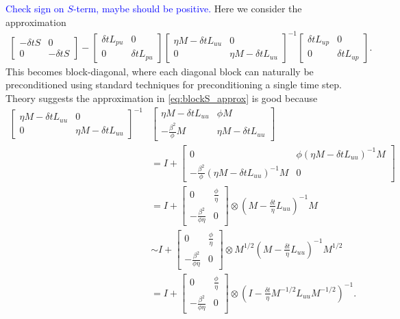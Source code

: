 \documentclass[a4paper,10pt]{article}
\newcommand{\tcb}{\textcolor{blue}}
\begin{document}
%
\tcb{Check sign on $S$-term, maybe should be positive.} Here we consider
the approximation
%
\begin{align}\label{eq:blockS_approx}
\begin{bmatrix} -\delta tS & 0 \\ 0 & -\delta tS\end{bmatrix} 
	- \begin{bmatrix} \delta tL_{pu} & 0 \\ 0 & \delta tL_{pu}\end{bmatrix}
	\begin{bmatrix} \eta M - \delta tL_{uu} & 0 \\
		0 & \eta M - \delta tL_{uu} \end{bmatrix}^{-1}
	\begin{bmatrix} \delta tL_{up} & 0 \\ 0 & \delta tL_{up} \end{bmatrix}.
\end{align}
%
This becomes block-diagonal, where each diagonal block can naturally be
preconditioned using standard techniques for preconditioning a single
time step. Theory suggests the approximation in \eqref{eq:blockS_approx}
is good because
%
\begin{align}\label{eq:diag_prec}
\begin{bmatrix} \eta M - \delta tL_{uu} & 0 \\
		0 & \eta M - \delta tL_{uu} \end{bmatrix}^{-1}&
		\begin{bmatrix} \eta M - \delta tL_{uu} & \phi M \\
		-\frac{\beta^2}{\phi}M & \eta M - \delta tL_{uu} \end{bmatrix} \\
& = I + \begin{bmatrix} 0 & \phi(\eta M - \delta tL_{uu})^{-1} M \nonumber\\
		-\frac{\beta^2}{\phi}(\eta M - \delta tL_{uu})^{-1}M & 0 \end{bmatrix} \\
& = I + \begin{bmatrix} 0 & \frac{\phi}{\eta} \\ -\frac{\beta^2}{\phi\eta} & 0 \end{bmatrix}
	\otimes \left( M - \tfrac{\delta t}{\eta} L_{uu}\right)^{-1}M \nonumber\\
& \sim I + \begin{bmatrix} 0 & \frac{\phi}{\eta} \\ -\frac{\beta^2}{\phi\eta} & 0 \end{bmatrix}
	\otimes M^{1/2}\left( M - \tfrac{\delta t}{\eta} L_{uu}\right)^{-1}M^{1/2} \nonumber\\
& = I + \begin{bmatrix} 0 & \frac{\phi}{\eta} \\ -\frac{\beta^2}{\phi\eta} & 0 \end{bmatrix}
	\otimes \left( I - \tfrac{\delta t}{\eta} M^{-1/2}L_{uu}M^{-1/2}\right)^{-1}.\nonumber
\end{align}
\end{document}
